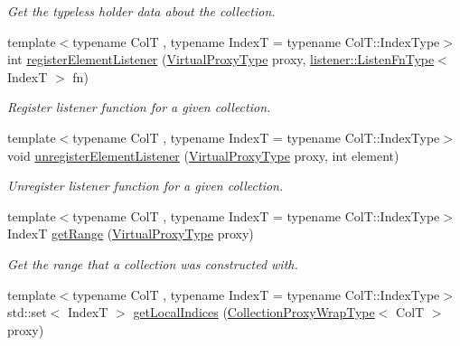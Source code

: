 \begin{DoxyCompactItemize}
\begin{DoxyCompactList}\small\item\em Get the typeless holder data about the collection. \end{DoxyCompactList}\item 
{\footnotesize template$<$typename ColT , typename IndexT  = typename Col\+T\+::\+Index\+Type$>$ }\\int \hyperlink{structvt_1_1vrt_1_1collection_1_1_collection_manager_a790738e12739058e7a09b4a3246169e8}{register\+Element\+Listener} (\hyperlink{namespacevt_a1b417dd5d684f045bb58a0ede70045ac}{Virtual\+Proxy\+Type} proxy, \hyperlink{namespacevt_1_1vrt_1_1collection_1_1listener_a0f35a1b6c7c88d9543939a204f418d7a}{listener\+::\+Listen\+Fn\+Type}$<$ IndexT $>$ fn)
\begin{DoxyCompactList}\small\item\em Register listener function for a given collection. \end{DoxyCompactList}\item 
{\footnotesize template$<$typename ColT , typename IndexT  = typename Col\+T\+::\+Index\+Type$>$ }\\void \hyperlink{structvt_1_1vrt_1_1collection_1_1_collection_manager_aecfd5c34b6d0b6781d3bb089ba1ae547}{unregister\+Element\+Listener} (\hyperlink{namespacevt_a1b417dd5d684f045bb58a0ede70045ac}{Virtual\+Proxy\+Type} proxy, int element)
\begin{DoxyCompactList}\small\item\em Unregister listener function for a given collection. \end{DoxyCompactList}\item 
{\footnotesize template$<$typename ColT , typename IndexT  = typename Col\+T\+::\+Index\+Type$>$ }\\IndexT \hyperlink{structvt_1_1vrt_1_1collection_1_1_collection_manager_a9259954aca1df3a68ad1d0a730687612}{get\+Range} (\hyperlink{namespacevt_a1b417dd5d684f045bb58a0ede70045ac}{Virtual\+Proxy\+Type} proxy)
\begin{DoxyCompactList}\small\item\em Get the range that a collection was constructed with. \end{DoxyCompactList}\item 
{\footnotesize template$<$typename ColT , typename IndexT  = typename Col\+T\+::\+Index\+Type$>$ }\\std\+::set$<$ IndexT $>$ \hyperlink{structvt_1_1vrt_1_1collection_1_1_collection_manager_a0708d6144e7beea89e4f07fae88e16fc}{get\+Local\+Indices} (\hyperlink{structvt_1_1vrt_1_1collection_1_1_collection_manager_a56458ed7f9bb22b631b9b3a745f42f94}{Collection\+Proxy\+Wrap\+Type}$<$ ColT $>$ proxy)

\end{DoxyCompactItemize}
